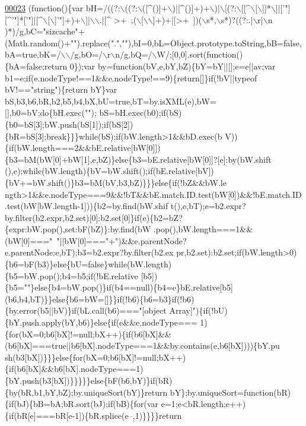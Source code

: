 \begin{DoxyCode}
\hypertarget{jquery_8js_source.tex_l00023}{}\hyperlink{jquery_8js_adc18d83abfd9f87d396e8fd6b6ac0fe1}{00023} (\textcolor{keyword}{function}()\{var bH=/((?:\(\backslash\)((?:\(\backslash\)([^()]+\(\backslash\))|[^()]+)+\(\backslash\))|\(\backslash\)[(?:\(\backslash\)[[^\(\backslash\)[\(\backslash\)]]*\(\backslash\)]|[\textcolor{stringliteral}{'"][^'}\textcolor{stringliteral}{"]*['"}]|[^\(\backslash\)[\(\backslash\)]\textcolor{stringliteral}{'"]+)+\(\backslash\)]|\(\backslash\)\(\backslash\).|[^
       >+~,(\(\backslash\)[\(\backslash\)\(\backslash\)]+)+|[>+~])(\(\backslash\)s*,\(\backslash\)s*)?((?:.|\(\backslash\)r|\(\backslash\)n
      )*)/g,bC="sizcache"+(Math.random()+"").replace(".",""),bI=0,bL=Object.prototype.toString,bB=false,bA=true,bK=/\(\backslash\)\(\backslash\)/g,bO=/\(\backslash\)r\(\backslash\)n/g,bQ=/\(\backslash\)W/;[0,0].sort(function()\{bA=false;return
       0\});var by=function(bV,e,bY,bZ)\{bY=bY||[];e=e||av;var
       b1=e;if(e.nodeType!==1&&e.nodeType!==9)\{return[]\}if(!bV||typeof bV!=="string")\{return bY\}var
       bS,b3,b6,bR,b2,b5,b4,bX,bU=true,bT=by.isXML(e),bW=[],b0=bV;do\{bH.exec("");
      bS=bH.exec(b0);if(bS)\{b0=bS[3];bW.push(bS[1]);if(bS[2])\{bR=bS[3];break\}\}\}while(bS);if(bW.length>1&&bD.exec(b
      V))\{if(bW.length===2&&bE.relative[bW[0]])\{b3=bM(bW[0]+bW[1],e,bZ)\}else\{b3=bE.relative[bW[0]]?[e]:by(bW.shift
      (),e);while(bW.length)\{bV=bW.shift();if(bE.relative[bV])\{bV+=bW.shift()\}b3=bM(bV,b3,bZ)\}\}\}else\{if(!bZ&&bW.le
      ngth>1&&e.nodeType===9&&!bT&&bE.match.ID.test(bW[0])&&!bE.match.ID.test(bW[bW.length-1]))\{b2=by.find(bW.shif
      t(),e,bT);e=b2.expr?by.filter(b2.expr,b2.set)[0]:b2.set[0]\}if(e)\{b2=bZ?\{expr:bW.pop(),set:bF(bZ)\}:by.find(bW
      .pop(),bW.length===1&&(bW[0]==="~"||bW[0]==="+")&&e.parentNode?e.parentNode:e,bT);b3=b2.expr?by.filter(b2.ex
      pr,b2.set):b2.set;if(bW.length>0)\{b6=bF(b3)\}else\{bU=false\}while(bW.length)\{b5=bW.pop();b4=b5;if(!bE.relative
      [b5])\{b5=""\}else\{b4=bW.pop()\}if(b4==null)\{b4=e\}bE.relative[b5](b6,b4,bT)\}\}else\{b6=bW=[]\}\}if(!b6)\{b6=b3\}if(!b6)\{by.error(b5||bV)\}if(bL.call(b6)==="[object
       Array]")\{if(!bU)\{bY.push.apply(bY,b6)\}else\{if(e&&e.nodeType===
      1)\{for(bX=0;b6[bX]!=null;bX++)\{if(b6[bX]&&(b6[bX]===true||b6[bX].nodeType===1&&by.contains(e,b6[bX])))\{bY.pu
      sh(b3[bX])\}\}\}else\{for(bX=0;b6[bX]!=null;bX++)\{if(b6[bX]&&b6[bX].nodeType===1)\{bY.push(b3[bX])\}\}\}\}\}else\{bF(b6,bY)\}if(bR)\{by(bR,b1,bY,bZ);by.uniqueSort(bY)\}return
       bY\};by.uniqueSort=function(bR)\{if(bJ)\{bB=bA;bR.sort(bJ);if(bB)\{for(var e=1;e<bR.length;e++)\{if(bR[e]===bR[e-1])\{bR.splice(e--,1)\}\}\}\}return
}
\end{DoxyCode}
